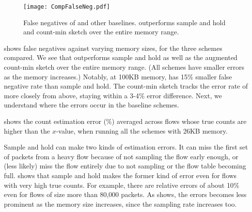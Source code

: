 \begin{figure}[h]
\texttt{[image: CompFalseNeg.pdf]}
\caption{False negatives of \TheSystem and other
  baselines. \TheSystem outperforms sample and hold and count-min sketch over
  the entire memory range.}
\label{fig:FalseNegvsMSchemes}
\end{figure}


  shows false negatives
against varying memory sizes, for the three schemes compared. We see that
\TheSystem outperforms sample and hold as well as the augmented count-min sketch
over the entire memory range. (All schemes have smaller errors as the memory
increases.) Notably, at 100KB memory, \TheSystem has 15\% smaller false negative
rate than sample and hold. The count-min sketch tracks the error rate of
\TheSystem more closely from above, staying within a 3-4\% error
difference. Next, we understand where the errors occur in the baseline schemes.

 
shows the count estimation error (\%) averaged across flows whose true
  counts are higher than the $x$-value, when running all the schemes with 26KB
  memory.

Sample and hold can make two kinds of estimation errors. It can miss the first
set of packets from a heavy flow because of not sampling the flow early enough,
or (less likely) miss the flow entirely due to not sampling or the flow table
becoming full.  shows that sample and hold makes
the former kind of error even for flows with very high true counts. For
example, there are relative errors of about 10\% even for flows of size more
than 80,000 packets. As  shows, the errors becomes less
prominent as the memory size increases, since the sampling rate increases too.

